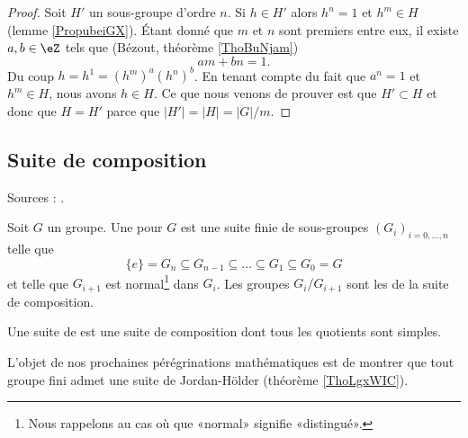 \begin{proof}
    Soit \( H'\) un sous-groupe d'ordre \( n\). Si \( h\in H'\) alors \( h^n=1\) et \( h^m\in H\) (lemme \ref{PropubeiGX}). Étant donné que \( m\) et \( n\) sont premiers entre eux, il existe \( a,b\in \eZ\) tels que (Bézout, théorème \ref{ThoBuNjam})
    \begin{equation}
        am+bn=1.
    \end{equation}
    Du coup \( h=h^1=(h^m)^a(h^n)^b\). En tenant compte du fait que \( a^n=1\) et \( h^m\in H\), nous avons \( h\in H\). Ce que nous venons de prouver est que \( H'\subset H\) et donc que \( H=H'\) parce que \( | H' |=| H |=| G |/m\).
\end{proof}

\subsection{Suite de composition}


Sources : \cite{NjCCfW,jxWKGB}.

\begin{definition}
Soit \( G\) un groupe. Une  pour \( G\) est une suite finie de sous-groupes \( (G_i)_{i=0,\ldots, n}\) telle que
\begin{equation}
    \{ e \}=G_n\subseteq G_{n-1}\subseteq\ldots\subseteq G_1\subseteq G_0=G
\end{equation}
et telle que \( G_{i+1}\) est normal\footnote{Nous rappelons au cas où que «normal» signifie «distingué».} dans \( G_i\). Les groupes \( G_i/G_{i+1}\) sont les  de la suite de composition.

    Une suite de  est une suite de composition dont tous les quotients sont simples.
\end{definition}
L'objet de nos prochaines pérégrinations mathématiques est de montrer que tout groupe fini admet une suite de Jordan-Hölder (théorème \ref{ThoLgxWIC}).


